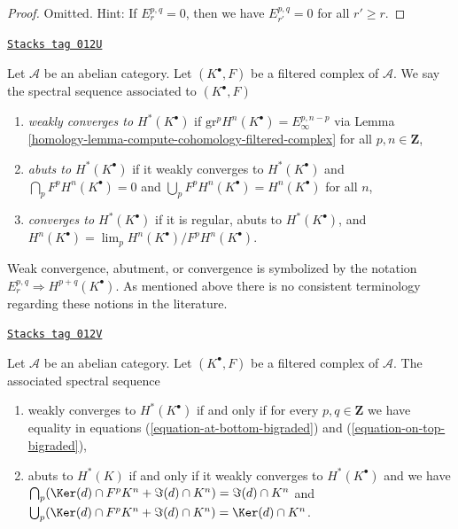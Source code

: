 \begin{proof}
Omitted. Hint: If $E_r^{p, q} = 0$, then we have $E_{r'}^{p, q} = 0$
for all $r' \geq r$.
\end{proof}

\begin{definition}
\label{homology-definition-filtered-complex-ss-converges}
\href{https://stacks.math.columbia.edu/tag/012U}{\texttt{Stacks tag 012U}}

Let $\mathcal{A}$ be an abelian category. Let $(K^\bullet, F)$ be a
filtered complex of $\mathcal{A}$. We say the spectral sequence
associated to $(K^\bullet, F)$
\begin{enumerate}
\item {\it weakly converges to $H^*(K^\bullet)$} if
$\text{gr}^pH^n(K^\bullet) = E_{\infty}^{p, n - p}$
via Lemma \ref{homology-lemma-compute-cohomology-filtered-complex}
for all $p, n \in \mathbf{Z}$,
\item {\it abuts to $H^*(K^\bullet)$} if it weakly converges to
$H^*(K^\bullet)$ and $\bigcap_p F^pH^n(K^\bullet) = 0$ and
$\bigcup_p F^p H^n(K^\bullet) = H^n(K^\bullet)$ for all $n$,
\item {\it converges to $H^*(K^\bullet)$} if it is regular,
abuts to $H^*(K^\bullet)$, and
$H^n(K^\bullet) = \lim_p H^n(K^\bullet)/F^pH^n(K^\bullet)$.
\end{enumerate}
\end{definition}

Weak convergence, abutment, or convergence is symbolized by the notation
$E_r^{p, q} \Rightarrow H^{p + q}(K^\bullet)$.
As mentioned above there is no consistent terminology regarding
these notions in the literature.

\begin{lemma}
\label{homology-lemma-filtered-complex-ss-converges}
\href{https://stacks.math.columbia.edu/tag/012V}{\texttt{Stacks tag 012V}}

Let $\mathcal{A}$ be an abelian category. Let $(K^\bullet, F)$ be a filtered
complex of $\mathcal{A}$. The associated spectral sequence
\begin{enumerate}
\item weakly converges to $H^*(K^\bullet)$ if and only if for every
$p, q \in \mathbf{Z}$ we have equality in equations
(\ref{equation-at-bottom-bigraded}) and (\ref{equation-on-top-bigraded}),
\item abuts to $H^*(K)$ if and only if it weakly converges to $H^*(K^\bullet)$
and we have
$\bigcap_p (\Ker(d) \cap F^pK^n + \Im(d) \cap K^n) = \Im(d) \cap K^n$
and
$\bigcup_p (\Ker(d) \cap F^pK^n + \Im(d) \cap K^n) = \Ker(d) \cap K^n$.
\end{enumerate}
\end{lemma}

